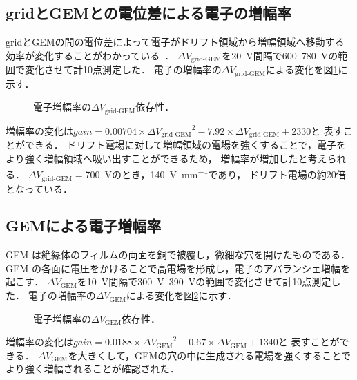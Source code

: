\documentclass[../master]{subfiles}
\begin{document}
\subsection{gridとGEMとの電位差による電子の増幅率}
gridとGEMの間の電位差によって電子がドリフト領域から増幅領域へ移動する効率が変化することがわかっている~\cite{furuno}．
$\Delta V_{\text{grid-GEM}}$を\SI{20}{\volt}間隔で\SI{600}{}--\SI{780}{\volt}の範囲で変化させて計10点測定した．
電子の増幅率の$\Delta V_{\text{grid-GEM}}$による変化を図\ref{fig::gain_grid_GEM_V_dep}に示す．
\begin{figure}
  \centering
  \scalebox{0.7}{}
  \caption{電子増幅率の$\Delta V_{\text{grid-GEM}}$依存性．}
  \label{fig::gain_grid_GEM_V_dep}
\end{figure}
増幅率の変化は$\mathit{gain} = 0.00704\times{\Delta V_{\text{grid-GEM}}}^2-7.92\times{\Delta V_{\text{grid-GEM}}}+2330$と
表すことができる．
ドリフト電場に対して増幅領域の電場を強くすることで，電子をより強く増幅領域へ吸い出すことができるため，
増幅率が増加したと考えられる．
$\Delta V_{\text{grid-GEM}} = $\SI{700}{\volt}のとき，\SI{140}{\volt\per\milli\metre}であり，
ドリフト電場の約20倍となっている．

\subsection{GEMによる電子増幅率}
GEM は絶縁体のフィルムの両面を銅で被覆し，微細な穴を開けたものである．
GEM の各面に電圧をかけることで高電場を形成し，電子のアバランシェ増幅を起こす．
$\Delta V_{\text{GEM}}$を\SI{10}{\volt}間隔で\SIrange{300}{390}{\volt}の範囲で変化させて計10点測定した．
電子の増幅率の$\Delta V_{\text{GEM}}$による変化を図\ref{fig::gain_GEM_V_dep}に示す．
\begin{figure}
  \centering
  \scalebox{0.7}{}
  \caption{電子増幅率の$\Delta V_{\text{GEM}}$依存性．}
  \label{fig::gain_GEM_V_dep}
\end{figure}
増幅率の変化は$\mathit{gain} = 0.0188\times{\Delta V_{\text{GEM}}}^2-0.67\times{\Delta V_{\text{GEM}}}+1340$と
表すことができる．
$\Delta V_{\text{GEM}}$を大きくして，GEMの穴の中に生成される電場を強くすることでより強く増幅されることが確認された．
\end{document}
